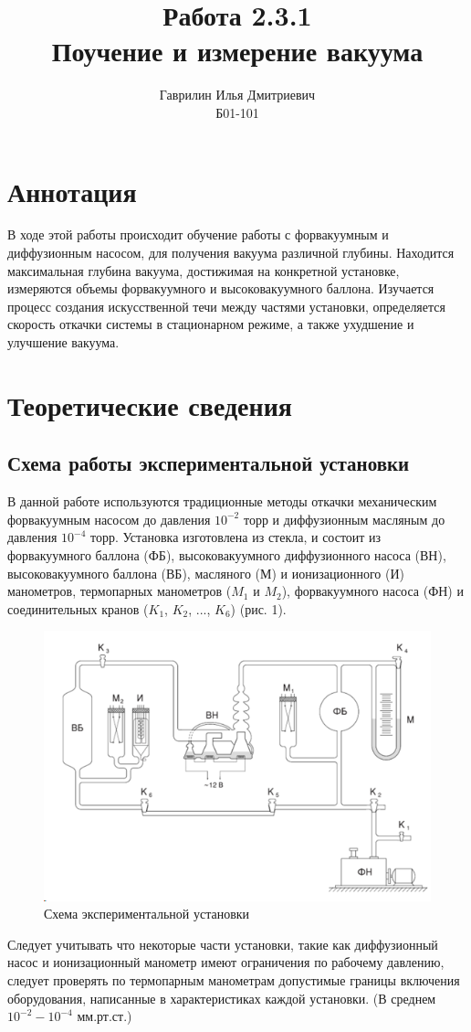 \documentclass[a4paper, 12pt]{article}%
\author{Гаврилин Илья Дмитриевич \\
	Б01-101}
\title{\textbf{Работа 2.3.1 \\ 
		Поучение и измерение вакуума}}
\begin{document}
		\maketitle
	\section{Аннотация}
	В ходе этой работы происходит обучение работы с форвакуумным и диффузионным насосом, для получения вакуума различной глубины. Находится максимальная глубина вакуума, достижимая на конкретной установке, измеряются объемы форвакуумного и высоковакуумного баллона.
	Изучается процесс создания искусственной течи между частями установки, определяется скорость откачки системы в стационарном режиме, а также ухудшение и улучшение вакуума.
	\section{Теоретические сведения}
	\subsection{Схема работы экспериментальной установки}
	В данной работе используются традиционные методы откачки механическим форвакуумным насосом до давления $10^{-2}$ торр и диффузионным масляным до давления $10^{-4}$ торр. Установка изготовлена из стекла, и состоит из форвакуумного баллона (ФБ), высоковакуумного диффузионного насоса (ВН), 
	высоковакуумного баллона (ВБ), масляного (М) и ионизационного (И) манометров, термопарных манометров ($M_{1}$ и $M_{2}$), форвакуумного насоса (ФН) и соединительных кранов ($K_{1}$, $K_{2}$, ..., $K_{6}$) (рис. 1).\linebreak
	\begin{figure}[h]
		\centering
		\includegraphics[width=0.6\linewidth]{screenshot001}
		\caption{Схема экспериментальной установки}
	\end{figure}

	Следует учитывать что некоторые части установки, такие как диффузионный насос и ионизационный манометр имеют ограничения по рабочему давлению, следует проверять по термопарным манометрам допустимые границы включения оборудования, написанные в характеристиках каждой установки. (В среднем $10^{-2} - 10^{-4}$ мм.рт.ст.)
\end{document}
